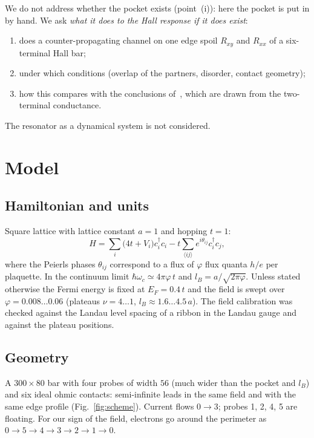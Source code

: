 \documentclass[11pt,a4paper]{article}
\newcommand{\Rxy}{R_{xy}}
\newcommand{\Rxx}{R_{xx}}
\newcommand{\lB}{l_B}
\newcommand{\EF}{E_F}
\newcommand{\hw}{\hbar\omega_c}
\begin{document}
We do not address whether the pocket exists (point~(i)): here the pocket is
put in by hand. We ask \emph{what it does to the Hall response if it does
exist}:
\begin{enumerate}
\item does a counter-propagating channel on one edge spoil $\Rxy$ and
      $\Rxx$ of a six-terminal Hall bar;
\item under which conditions (overlap of the partners, disorder, contact
      geometry);
\item how this compares with the conclusions of~\cite{andolina}, which are
      drawn from the two-terminal conductance.
\end{enumerate}
The resonator as a dynamical system is not considered.

\section{Model}

\subsection{Hamiltonian and units}
Square lattice with lattice constant $a=1$ and hopping $t=1$:
\begin{equation}
H=\sum_i\bigl(4t+V_i\bigr)c_i^\dagger c_i-t\sum_{\langle ij\rangle}
e^{i\theta_{ij}}c_i^\dagger c_j,
\end{equation}
where the Peierls phases $\theta_{ij}$ correspond to a flux of $\varphi$
flux quanta $h/e$ per plaquette. In the continuum limit
$\hw\simeq4\pi\varphi\,t$ and $\lB=a/\sqrt{2\pi\varphi}$.
Unless stated otherwise the Fermi energy is fixed at $\EF=0.4\,t$ and the
field is swept over $\varphi=0.008\ldots0.06$ (plateaus $\nu=4\ldots1$,
$\lB\approx1.6\ldots4.5\,a$). The field calibration was checked against the
Landau level spacing of a ribbon in the Landau gauge and against the
plateau positions.

\subsection{Geometry}
A $300\times80$ bar with four probes of width $56$ (much wider than the
pocket and $\lB$) and six ideal ohmic contacts: semi-infinite leads in the
same field and with the same edge profile (Fig.~\ref{fig:scheme}). Current
flows $0\to3$; probes 1, 2, 4, 5 are floating. For our sign of the field,
electrons go around the perimeter as $0\to5\to4\to3\to2\to1\to0$.
\end{document}
